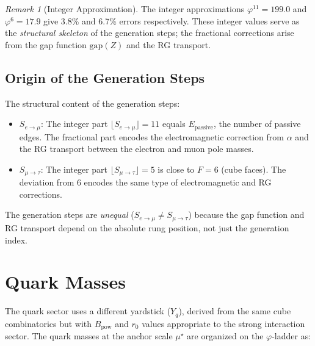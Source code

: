 \documentclass[12pt,a4paper]{article}
\theoremstyle{definition}
\theoremstyle{remark}
\newtheorem{remark}[theorem]{Remark}
\begin{document}
\begin{remark}[Integer Approximation]
\label{rem:integer}
The integer approximations $\varphi^{11} = 199.0$ and
$\varphi^6 = 17.9$ give 3.8\% and 6.7\% errors respectively.
These integer values serve as the \emph{structural skeleton}
of the generation steps; the fractional corrections arise from
the gap function $\mathrm{gap}(Z)$ and the RG transport.
\end{remark}

\subsection{Origin of the Generation Steps}

The structural content of the generation steps:
\begin{itemize}
  \item $S_{e \to \mu}$: The integer part $\lfloor S_{e \to
  \mu} \rfloor = 11$ equals $E_{\mathrm{passive}}$, the number
  of passive edges.  The fractional part encodes the
  electromagnetic correction from $\alpha$ and the RG transport
  between the electron and muon pole masses.
  \item $S_{\mu \to \tau}$: The integer part
  $\lfloor S_{\mu \to \tau} \rfloor = 5$ is close to $F = 6$
  (cube faces).  The deviation from 6 encodes the same type of
  electromagnetic and RG corrections.
\end{itemize}
The generation steps are \emph{unequal}
($S_{e \to \mu} \neq S_{\mu \to \tau}$) because the
gap function and RG transport depend on the absolute rung
position, not just the generation index.

\section{Quark Masses}
\label{sec:quarks}

The quark sector uses a different yardstick ($Y_q$), derived
from the same cube combinatorics but with $B_{\mathrm{pow}}$
and $r_0$ values appropriate to the strong interaction sector.
The quark masses at the anchor scale $\mu^\star$ are organized
on the $\varphi$-ladder as:
\end{document}
